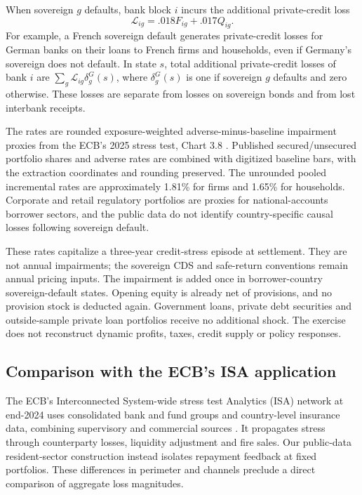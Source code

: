 When sovereign $g$ defaults, bank block $i$ incurs the additional private-credit loss
\[
 \mathcal L_{ig}=.018F_{ig}+.017Q_{ig}.
\]
For example, a French sovereign default generates private-credit losses for German banks on their loans to French firms and households, even if Germany's sovereign does not default. In state $s$, total additional private-credit losses of bank $i$ are $\sum_g\mathcal L_{ig}\delta_g^G(s)$, where $\delta_g^G(s)$ is one if sovereign $g$ defaults and zero otherwise. These losses are separate from losses on sovereign bonds and from lost interbank receipts.

The rates are rounded exposure-weighted adverse-minus-baseline impairment proxies from the ECB's 2025 stress test, Chart 3.8 \citep{ECBStress2025}. Published secured/unsecured portfolio shares and adverse rates are combined with digitized baseline bars, with the extraction coordinates and rounding preserved. The unrounded pooled incremental rates are approximately 1.81\% for firms and 1.65\% for households. Corporate and retail regulatory portfolios are proxies for national-accounts borrower sectors, and the public data do not identify country-specific causal losses following sovereign default.

These rates capitalize a three-year credit-stress episode at settlement. They are not annual impairments; the sovereign CDS and safe-return conventions remain annual pricing inputs. The impairment is added once in borrower-country sovereign-default states. Opening equity is already net of provisions, and no provision stock is deducted again. Government loans, private debt securities and outside-sample private loan portfolios receive no additional shock. The exercise does not reconstruct dynamic profits, taxes, credit supply or policy responses.

\subsection{Comparison with the ECB's ISA application}
The ECB's Interconnected System-wide stress test Analytics (ISA) network at end-2024 uses consolidated bank and fund groups and country-level insurance data, combining supervisory and commercial sources \citep{GrassiEtAl2025}. It propagates stress through counterparty losses, liquidity adjustment and fire sales. Our public-data resident-sector construction instead isolates repayment feedback at fixed portfolios. These differences in perimeter and channels preclude a direct comparison of aggregate loss magnitudes.

